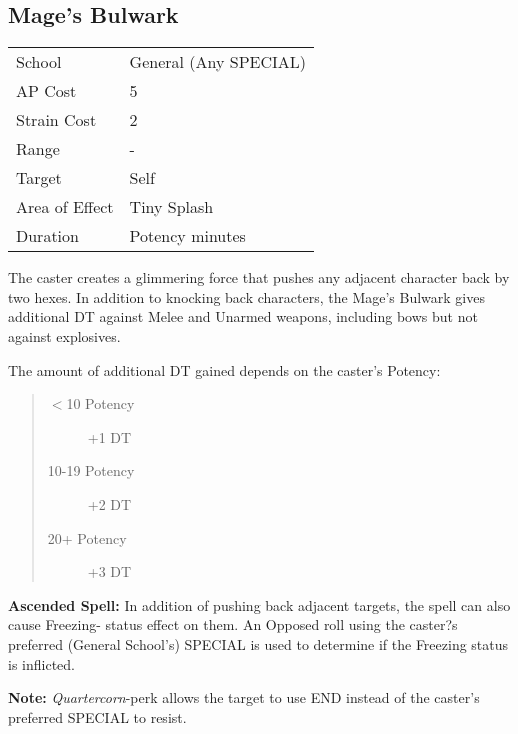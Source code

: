 \documentclass[11pt,a4paper,twocolumn]{book}
\begin{document}

\subsection*{Mage's Bulwark}
{
	\begin{tabu} to 75mm{| X[l,4] | X[l,7] |}
		\hline
		School 			& General (Any SPECIAL) 	\\
		AP Cost	      	& 5 					\\
		Strain Cost     & 2 					\\
		Range     		& - 					\\
		Target      	& Self					\\
		Area of Effect  & Tiny Splash  	 				\\
		Duration     	& Potency minutes		\\ \hline
	\end{tabu}
	
}

\medskip

The caster creates a glimmering force that pushes any adjacent character back by two hexes. In addition to knocking back characters, the Mage's Bulwark gives additional DT against Melee and Unarmed weapons, including bows but not against explosives.

The amount of additional DT gained depends on the caster's Potency:
\begin{quote}
	\begin{description}
		\item[$<$10 Potency] 	+1 DT
		\item[10-19 Potency] 	+2 DT
		\item[20+ Potency] 		+3 DT
	\end{description}	
\end{quote}

\bigskip

\textbf{Ascended Spell:} In addition of pushing back adjacent targets, the spell can also cause Freezing- status effect on them. An Opposed roll using the caster?s preferred (General School's) SPECIAL is used to determine if the Freezing status is inflicted.

\textbf{Note:} \textit{Quartercorn}-perk allows the target to use END instead of the caster's preferred SPECIAL to resist.

\end{document}
